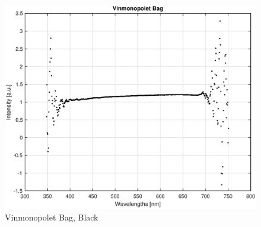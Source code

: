 \begin{appendices}
\begin{figure}
    \centering
    \includegraphics[width = 12cm]{Images/appendix/vinmono.eps}
    \caption{Vinmonopolet Bag, Black}
    \label{fig:vinmono}
\end{figure}





\end{appendices}





